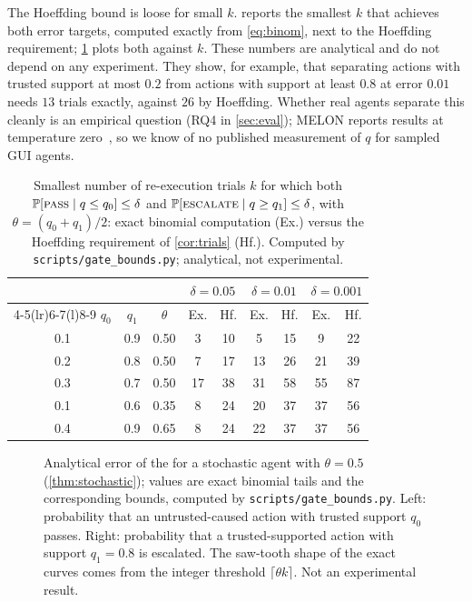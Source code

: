 The Hoeffding bound is loose for small $k$.  reports the smallest $k$ that achieves both error targets, computed exactly from \cref{eq:binom}, next to the Hoeffding requirement; \cref{fig:bounds} plots both against $k$. These numbers are analytical and do not depend on any experiment. They show, for example, that separating actions with trusted support at most $0.2$ from actions with support at least $0.8$ at error $0.01$ needs $13$ trials exactly, against $26$ by Hoeffding. Whether real agents separate this cleanly is an empirical question (RQ4 in \cref{sec:eval}); MELON reports results at temperature zero~\cite{zhu2025melon}, so we know of no published measurement of $q$ for sampled GUI agents.

\begin{table}[t]
\centering
\caption{Smallest number of re-execution trials $k$ for which both $\mathbb{P}[\text{\textsc{pass}}\mid q\le q_0]\le\delta$ and $\mathbb{P}[\text{\textsc{escalate}}\mid q\ge q_1]\le\delta$, with $\theta=(q_0+q_1)/2$: exact binomial computation (Ex.) versus the Hoeffding requirement of \cref{cor:trials} (Hf.). Computed by \texttt{scripts/gate\_bounds.py}; analytical, not experimental.}
\label{tab:mintrials}
\footnotesize
\begin{tabular}{@{}ccc cc cc cc@{}}
\toprule
& & & \multicolumn{2}{c}{$\delta=0.05$} & \multicolumn{2}{c}{$\delta=0.01$} & \multicolumn{2}{c}{$\delta=0.001$} \\
\cmidrule(lr){4-5}\cmidrule(lr){6-7}\cmidrule(l){8-9}
$q_0$ & $q_1$ & $\theta$ & Ex. & Hf. & Ex. & Hf. & Ex. & Hf. \\
\midrule
0.1 & 0.9 & 0.50 & 3 & 10 & 5 & 15 & 9 & 22 \\
0.2 & 0.8 & 0.50 & 7 & 17 & 13 & 26 & 21 & 39 \\
0.3 & 0.7 & 0.50 & 17 & 38 & 31 & 58 & 55 & 87 \\
0.1 & 0.6 & 0.35 & 8 & 24 & 20 & 37 & 37 & 56 \\
0.4 & 0.9 & 0.65 & 8 & 24 & 22 & 37 & 37 & 56 \\
\bottomrule
\end{tabular}
\end{table}

\begin{figure}[t]
  \centering
  
  \caption{Analytical error of the \CG{} for a stochastic agent with $\theta=0.5$ (\cref{thm:stochastic}); values are exact binomial tails and the corresponding bounds, computed by \texttt{scripts/gate\_bounds.py}. Left: probability that an untrusted-caused action with trusted support $q_0$ passes. Right: probability that a trusted-supported action with support $q_1=0.8$ is escalated. The saw-tooth shape of the exact curves comes from the integer threshold $\lceil\theta k\rceil$. Not an experimental result.}
  \label{fig:bounds}
\end{figure}

